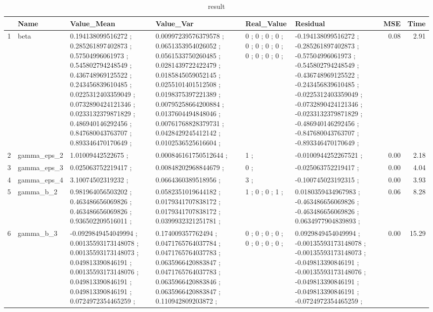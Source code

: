 \begin{table}[ht]
\begin{center}
\begin{tabular}{rlllllrr}
  \hline
 & Name & Value\_Mean & Value\_Var & Real\_Value & Residual & MSE & Time \\ 
  \hline
1 & beta &  0.194138099516272 ; 0.285261897402873 ; 0.57504996061973 ; 0.545802794248549 ; 0.436748969125522 ; 0.243456839610485 ; 0.0225312403359049 ; 0.0732890424121346 ; 0.0233132379871829 ; 0.486940146292456 ; 0.847680043763707 ; 0.893346470170649 ; &  0.00997239576379578 ; 0.0651353954026052 ; 0.0561533750260485 ; 0.0281439722422479 ; 0.0185845059052145 ; 0.0255101401512508 ; 0.0198375397221389 ; 0.00795258664200884 ; 0.0137604494848046 ; 0.00761768828379731 ; 0.0428429245412142 ; 0.0102536525616604 ; &  0 ; 0 ; 0 ; 0 ; 0 ; 0 ; 0 ; 0 ; 0 ; 0 ; 0 ; 0 ; &  -0.194138099516272 ; -0.285261897402873 ; -0.57504996061973 ; -0.545802794248549 ; -0.436748969125522 ; -0.243456839610485 ; -0.0225312403359049 ; -0.0732890424121346 ; -0.0233132379871829 ; -0.486940146292456 ; -0.847680043763707 ; -0.893346470170649 ; & 0.08 & 2.91 \\ 
  2 & gamma\_eps\_2 &  1.01009442522675 ; &  0.000846161750512644 ; &  1 ; &  -0.0100944252267521 ; & 0.00 & 2.18 \\ 
  3 & gamma\_eps\_3 &  0.025063752219417 ; &  0.00848202968844679 ; &  0 ; &  -0.025063752219417 ; & 0.00 & 4.04 \\ 
  4 & gamma\_eps\_4 &  3.10074502319232 ; &  0.0664360389518956 ; &  3 ; &  -0.100745023192315 ; & 0.00 & 3.93 \\ 
  5 & gamma\_b\_2 &  0.981964056503202 ; 0.463486656069826 ; 0.463486656069826 ; 0.936502209516011 ; &  0.0582351019644182 ; 0.0179341707838172 ; 0.0179341707838172 ; 0.0399932321251781 ; &  1 ; 0 ; 0 ; 1 ; &  0.0180359434967983 ; -0.463486656069826 ; -0.463486656069826 ; 0.0634977904839893 ; & 0.06 & 8.28 \\ 
  6 & gamma\_b\_3 &  -0.0929849454049994 ; 0.00135593173148078 ; 0.00135593173148073 ; 0.049813390846191 ; 0.00135593173148076 ; 0.049813390846191 ; 0.049813390846191 ; 0.0724972354465259 ; &  0.174009357762494 ; 0.0471765764037784 ; 0.0471765764037783 ; 0.0635966420883847 ; 0.0471765764037783 ; 0.0635966420883846 ; 0.0635966420883847 ; 0.110942809203872 ; &  0 ; 0 ; 0 ; 0 ; 0 ; 0 ; 0 ; 0 ; &  0.0929849454049994 ; -0.00135593173148078 ; -0.00135593173148073 ; -0.049813390846191 ; -0.00135593173148076 ; -0.049813390846191 ; -0.049813390846191 ; -0.0724972354465259 ; & 0.00 & 15.29 \\ 
   \hline
\end{tabular}
\caption{result}
\end{center}
\end{table}
